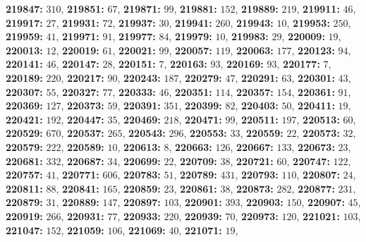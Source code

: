 \textsf{\bfseries 219847:} $310$, \textsf{\bfseries 219851:} $67$, \textsf{\bfseries 219871:} $99$, \textsf{\bfseries 219881:} $152$, \textsf{\bfseries 219889:} $219$, \textsf{\bfseries 219911:} $46$, \textsf{\bfseries 219917:} $27$, \textsf{\bfseries 219931:} $72$, \textsf{\bfseries 219937:} $30$, \textsf{\bfseries 219941:} $260$, \textsf{\bfseries 219943:} $10$, \textsf{\bfseries 219953:} $250$, \textsf{\bfseries 219959:} $41$, \textsf{\bfseries 219971:} $91$, \textsf{\bfseries 219977:} $84$, \textsf{\bfseries 219979:} $10$, \textsf{\bfseries 219983:} $29$, \textsf{\bfseries 220009:} $19$, \textsf{\bfseries 220013:} $12$, \textsf{\bfseries 220019:} $61$, \textsf{\bfseries 220021:} $99$, \textsf{\bfseries 220057:} $119$, \textsf{\bfseries 220063:} $177$, \textsf{\bfseries 220123:} $94$, \textsf{\bfseries 220141:} $46$, \textsf{\bfseries 220147:} $28$, \textsf{\bfseries 220151:} $7$, \textsf{\bfseries 220163:} $93$, \textsf{\bfseries 220169:} $93$, \textsf{\bfseries 220177:} $7$, \textsf{\bfseries 220189:} $220$, \textsf{\bfseries 220217:} $90$, \textsf{\bfseries 220243:} $187$, \textsf{\bfseries 220279:} $47$, \textsf{\bfseries 220291:} $63$, \textsf{\bfseries 220301:} $43$, \textsf{\bfseries 220307:} $55$, \textsf{\bfseries 220327:} $77$, \textsf{\bfseries 220333:} $46$, \textsf{\bfseries 220351:} $114$, \textsf{\bfseries 220357:} $154$, \textsf{\bfseries 220361:} $91$, \textsf{\bfseries 220369:} $127$, \textsf{\bfseries 220373:} $59$, \textsf{\bfseries 220391:} $351$, \textsf{\bfseries 220399:} $82$, \textsf{\bfseries 220403:} $50$, \textsf{\bfseries 220411:} $19$, \textsf{\bfseries 220421:} $192$, \textsf{\bfseries 220447:} $35$, \textsf{\bfseries 220469:} $218$, \textsf{\bfseries 220471:} $99$, \textsf{\bfseries 220511:} $197$, \textsf{\bfseries 220513:} $60$, \textsf{\bfseries 220529:} $670$, \textsf{\bfseries 220537:} $265$, \textsf{\bfseries 220543:} $296$, \textsf{\bfseries 220553:} $33$, \textsf{\bfseries 220559:} $22$, \textsf{\bfseries 220573:} $32$, \textsf{\bfseries 220579:} $222$, \textsf{\bfseries 220589:} $10$, \textsf{\bfseries 220613:} $8$, \textsf{\bfseries 220663:} $126$, \textsf{\bfseries 220667:} $133$, \textsf{\bfseries 220673:} $23$, \textsf{\bfseries 220681:} $332$, \textsf{\bfseries 220687:} $34$, \textsf{\bfseries 220699:} $22$, \textsf{\bfseries 220709:} $38$, \textsf{\bfseries 220721:} $60$, \textsf{\bfseries 220747:} $122$, \textsf{\bfseries 220757:} $41$, \textsf{\bfseries 220771:} $606$, \textsf{\bfseries 220783:} $51$, \textsf{\bfseries 220789:} $431$, \textsf{\bfseries 220793:} $110$, \textsf{\bfseries 220807:} $24$, \textsf{\bfseries 220811:} $88$, \textsf{\bfseries 220841:} $165$, \textsf{\bfseries 220859:} $23$, \textsf{\bfseries 220861:} $38$, \textsf{\bfseries 220873:} $282$, \textsf{\bfseries 220877:} $231$, \textsf{\bfseries 220879:} $31$, \textsf{\bfseries 220889:} $147$, \textsf{\bfseries 220897:} $103$, \textsf{\bfseries 220901:} $393$, \textsf{\bfseries 220903:} $150$, \textsf{\bfseries 220907:} $45$, \textsf{\bfseries 220919:} $266$, \textsf{\bfseries 220931:} $77$, \textsf{\bfseries 220933:} $220$, \textsf{\bfseries 220939:} $70$, \textsf{\bfseries 220973:} $120$, \textsf{\bfseries 221021:} $103$, \textsf{\bfseries 221047:} $152$, \textsf{\bfseries 221059:} $106$, \textsf{\bfseries 221069:} $40$, \textsf{\bfseries 221071:} $19$, 
